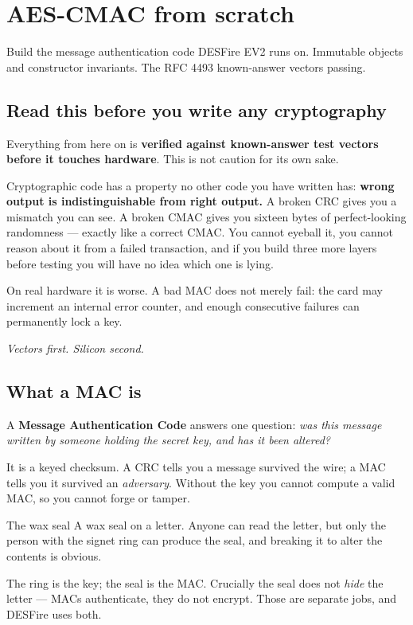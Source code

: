 \chapter{AES-CMAC from scratch}
\label{ch:cmac}

\chapterbrief
  {Build the message authentication code DESFire EV2 runs on.}
  {Immutable objects and constructor invariants.}
  {The RFC 4493 known-answer vectors passing.}

\section{Read this before you write any cryptography}

Everything from here on is \textbf{verified against known-answer test vectors
before it touches hardware}. This is not caution for its own sake.

Cryptographic code has a property no other code you have written has:
\textbf{wrong output is indistinguishable from right output.} A broken CRC gives
you a mismatch you can see. A broken CMAC gives you sixteen bytes of
perfect-looking randomness --- exactly like a correct CMAC. You cannot eyeball
it, you cannot reason about it from a failed transaction, and if you build three
more layers before testing you will have no idea which one is lying.

On real hardware it is worse. A bad MAC does not merely fail: the card may
increment an internal error counter, and enough consecutive failures can
permanently lock a key.

\begin{center}\itshape\color{brewerred}
Vectors first. Silicon second.
\end{center}

\section{What a MAC is}

A \textbf{Message Authentication Code} answers one question: \emph{was this
message written by someone holding the secret key, and has it been altered?}

It is a keyed checksum. A CRC tells you a message survived the wire; a MAC tells
you it survived an \emph{adversary}. Without the key you cannot compute a valid
MAC, so you cannot forge or tamper.

\begin{analogy}{The wax seal}
A wax seal on a letter. Anyone can read the letter, but only the person with the
signet ring can produce the seal, and breaking it to alter the contents is
obvious.

The ring is the key; the seal is the MAC. Crucially the seal does not \emph{hide}
the letter --- MACs authenticate, they do not encrypt. Those are separate jobs,
and DESFire uses both.
\end{analogy}

